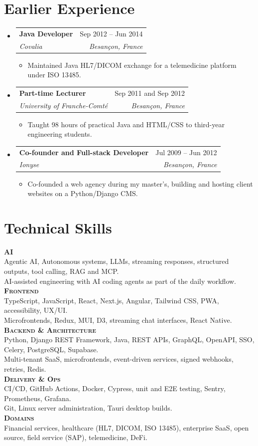 \documentclass[a4paper,11pt]{article}
\makeatletter
\newcommand{\resumeItem}[1]{
  \item\normalsize{
    {#1}
  }
}
\newcommand{\resumeSubheading}[4]{
  \vspace{4pt}\item
    \begin{tabular*}{0.97\textwidth}[t]{l@{\extracolsep{\fill}}r}
      \textbf{#1} & #2 \\
      \textit{\small#3} & \textit{\small #4} \\
    \end{tabular*}\vspace{0pt}
}
\newcommand{\resumeSubHeadingListStart}{\begin{itemize}[leftmargin=0.15in, label={}]}
\newcommand{\resumeSubHeadingListEnd}{\end{itemize}}
\newcommand{\resumeItemListStart}{\begin{itemize}}
\newcommand{\resumeItemListEnd}{\end{itemize}\vspace{2pt}}
\makeatother
\begin{document}
\section{Earlier Experience}\resumeSubHeadingListStart
\resumeSubheading{Java Developer}{Sep 2012 -- Jun 2014}{Covalia}{Besançon, France}
\resumeItemListStart
\resumeItem{Maintained Java HL7/DICOM exchange for a telemedicine platform under ISO 13485.}
\resumeItemListEnd
\resumeSubheading{Part-time Lecturer}{Sep 2011 and Sep 2012}{University of Franche-Comté}{Besançon, France}
\resumeItemListStart
\resumeItem{Taught 98 hours of practical Java and HTML/CSS to third-year engineering students.}
\resumeItemListEnd
\resumeSubheading{Co-founder and Full-stack Developer}{Jul 2009 -- Jun 2012}{Ionyse}{Besançon, France}
\resumeItemListStart
\resumeItem{Co-founded a web agency during my master's, building and hosting client websites on a Python/Django CMS.}
\resumeItemListEnd
\resumeSubHeadingListEnd

\section{Technical Skills}
\begingroup
\setlength{\parindent}{0pt}\setlength{\parskip}{0pt}\fontsize{10.5}{13}\selectfont
{\normalsize\bfseries\scshape AI}\\[1pt]
Agentic AI, Autonomous systems, LLMs, streaming responses, structured outputs, tool calling, RAG and MCP.\\
AI-assisted engineering with AI coding agents as part of the daily workflow.\\[3.5pt]
{\normalsize\bfseries\scshape Frontend}\\[1pt]
TypeScript, JavaScript, React, Next.js, Angular, Tailwind CSS, PWA, accessibility, UX/UI.\\
Microfrontends, Redux, MUI, D3, streaming chat interfaces, React Native.\\[3.5pt]
{\normalsize\bfseries\scshape Backend \& Architecture}\\[1pt]
Python, Django REST Framework, Java, REST APIs, GraphQL, OpenAPI, SSO, Celery, PostgreSQL, Supabase.\\
Multi-tenant SaaS, microfrontends, event-driven services, signed webhooks, retries, Redis.\\[3.5pt]
{\normalsize\bfseries\scshape Delivery \& Ops}\\[1pt]
CI/CD, GitHub Actions, Docker, Cypress, unit and E2E testing, Sentry, Prometheus, Grafana.\\
Git, Linux server administration, Tauri desktop builds.\\[3.5pt]
{\normalsize\bfseries\scshape Domains}\\[1pt]
Financial services, healthcare (HL7, DICOM, ISO 13485), enterprise SaaS, open source, field service (SAP), telemedicine, DeFi.
\par\endgroup
\end{document}
